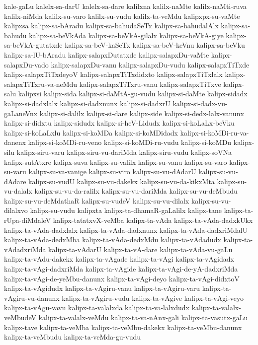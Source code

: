 {kale-gaLu
kalelx-sa-darU
kalelx-sa-dare
kalilxna
kalilx-naMte
kalilx-naMti-ruva
kalilx-niMda
kalilx-su-varo
kalilx-su-vudu
kalilx-ta-veMdu
kalipxpx-su-vaMte
kalipxsa
kalipx-sa-bAradu
kalipx-sa-bahudaSeTx
kalipx-sa-bahudalAlx
kalipx-sa-bahudu
kalipx-sa-beVkAda
kalipx-sa-beVkA-gilalx
kalipx-sa-beVkA-giye
kalipx-sa-beVkA-gutatxde
kalipx-sa-beV-kaSeTx
kalipx-sa-beV-keVnu
kalipx-sa-beVku
kalipx-sa-lU-bAradu
kalipx-salapxDutatxde
kalipx-salapxDu-vaMte
kalipx-salapxDu-vado
kalipx-salapxDu-vanu
kalipx-salapxDu-vudu
kalipx-salapxTiTxde
kalipx-salapxTiTxdeyoV
kalipx-salapxTiTxdidxto
kalipx-salapxTiTxlalx
kalipx-salapxTiTxru-va-neMdu
kalipx-salapxTiTxru-vanu
kalipx-salapxTiTxve
kalipx-salu
kalipxsi
kalipx-sida
kalipx-si-daMtA-gu-vudu
kalipx-si-daMte
kalipx-sidadx
kalipx-si-dadxlalx
kalipx-si-dadxnunx
kalipx-si-dadxrU
kalipx-si-dadx-vu-gaLaneVnx
kalipx-si-dalilx
kalipx-si-dare
kalipx-side
kalipx-si-dedx-lalx-vanunx
kalipx-si-didxtu
kalipx-sidudx
kalipx-si-heV-Lidudx
kalipx-si-koLaLx-beVku
kalipx-si-koLaLxlu
kalipx-si-koMDa
kalipx-si-koMDidadx
kalipx-si-koMDi-ru-va-danenx
kalipx-si-koMDi-ru-veno
kalipx-si-koMDi-ru-vudu
kalipx-si-koMDu
kalipx-silu
kalipx-siru-varu
kalipx-siru-vu-dariMda
kalipx-siru-vudu
kalipx-soVNa
kalipx-sutAtxre
kalipx-suva
kalipx-su-valilx
kalipx-su-vanu
kalipx-su-varo
kalipx-su-varu
kalipx-su-va-vanige
kalipx-su-viro
kalipx-su-vu-dAdarU
kalipx-su-vu-dAdare
kalipx-su-vudU
kalipx-su-vu-dakekx
kalipx-su-vu-da-kikxMta
kalipx-su-vu-dalalx
kalipx-su-vu-da-ralilx
kalipx-su-vu-dariMda
kalipx-su-vu-deMbudu
kalipx-su-vu-deMdathaR
kalipx-su-vudeV
kalipx-su-vu-dilalx
kalipx-su-vu-dilalxvo
kalipx-su-vudu
kalipxta
kalipx-ta-dhamaR-gaLalilx
kalipx-tane
kalipx-ta-rUpa-diMdaleV
kalipx-tatatxvX-veMba
kalipx-ta-vAda
kalipx-ta-vAda-dadxkUkx
kalipx-ta-vAda-dadxlalx
kalipx-ta-vAda-dadxnunx
kalipx-ta-vAda-dadxriMdalU
kalipx-ta-vAda-dedxMba
kalipx-ta-vAda-dedxMdu
kalipx-ta-vAdadudx
kalipx-ta-vAdadxriMda
kalipx-ta-vAdarU
kalipx-ta-vA-dare
kalipx-ta-vAda-vu-gaLu
kalipx-ta-vAdu-dakekx
kalipx-ta-vAgade
kalipx-ta-vAgi
kalipx-ta-vAgidadx
kalipx-ta-vAgi-dadxriMda
kalipx-ta-vAgide
kalipx-ta-vAgi-de-yA-dadxriMda
kalipx-ta-vAgi-de-yeMbu-danunx
kalipx-ta-vAgi-deyo
kalipx-ta-vAgi-didxtoV
kalipx-ta-vAgidudx
kalipx-ta-vAgiru-vanu
kalipx-ta-vAgiru-varu
kalipx-ta-vAgiru-vu-danunx
kalipx-ta-vAgiru-vudu
kalipx-ta-vAgive
kalipx-ta-vAgi-veyo
kalipx-ta-vAgu-vavu
kalipx-ta-valalxda
kalipx-ta-va-lalxdudx
kalipx-ta-valalx-veMbudeV
kalipx-ta-valalx-veMdu
kalipx-ta-va-nAnx-gali
kalipx-ta-vasutx-gaLu
kalipx-tave
kalipx-ta-veMba
kalipx-ta-veMbu-dakekx
kalipx-ta-veMbu-danunx
kalipx-ta-veMbudu
kalipx-ta-veMda-gu-vudu
}
